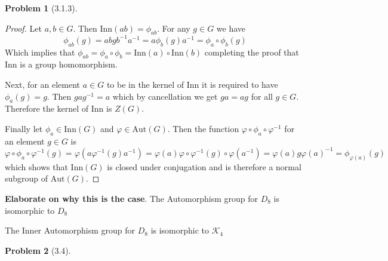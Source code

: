 \documentclass[10pt]{article}
\newcommand{\sk}{\vskip 10mm}
\theoremstyle{plain}
\newtheorem{problem}{Problem}
\theoremstyle{remark}
\begin{document}
\begin{problem}[3.1.3] %
  
\end{problem}

\begin{proof}
  Let $a,b\in G$. Then $\text{Inn}(ab)=\phi_{ab}$. For any $g\in G$ we have
  \[\phi_{ab}(g)=abgb^{-1}a^{-1}=a\phi_b(g)a^{-1}=\phi_a\circ\phi_b(g)\]
  Which implies that $\phi_{ab}=\phi_a\circ\phi_b=\text{Inn}(a)\circ\text{Inn}(b)$
  completing the proof that $\text{Inn}$ is a group homomorphism.

  Next, for an element $a\in G$ to be in the kernel of $\text{Inn}$
  it is required to have $\phi_a(g)=g$. Then
  $gag^{-1}=a$ which by cancellation we get $ga=ag$ for all $g\in G$.
  Therefore the kernel of $\text{Inn}$ is $Z(G)$.

  Finally let $\phi_a\in\text{Inn}(G)$ and $\varphi\in\text{Aut}(G)$. Then
  the function $\varphi\circ\phi_a\circ\varphi^{-1}$ for an element $g\in G$ is
  \[ \varphi\circ\phi_a\circ\varphi^{-1}(g)=\varphi(a\varphi^{-1}(g)a^{-1})=\varphi(a)\varphi\circ\varphi^{-1}(g)\circ\varphi(a^{-1})=\varphi(a)g\varphi(a)^{-1}=\phi_{\varphi(a)}(g) \]
  which shows that $\text{Inn}(G)$ is closed under conjugation and is therefore a
  normal subgroup of $\text{Aut}(G)$.
\end{proof}


\textbf{Elaborate on why this is the case}.
The Automorphism group for $D_8$ is isomorphic to $D_8$ 

The Inner Automorphism group for $D_8$ is isomorphic to $\mathcal{K}_4$

\sk

\begin{problem}[3.4] %
  
\end{problem}
\end{document}
